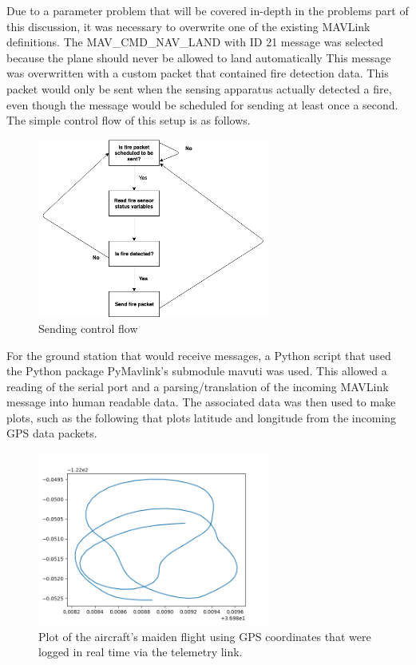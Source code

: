 \documentclass[12pt,journal,compsoc]{IEEEtran}
\begin{document}
Due to a parameter problem that will be covered in-depth in the problems part of this discussion, it was necessary to overwrite one of the existing MAVLink definitions. The MAV\_CMD\_NAV\_LAND with ID 21 message was selected because the plane should never be allowed to land automatically This message was overwritten with a custom packet that contained fire detection data. This packet would only be sent when the sensing apparatus actually detected a fire, even though the message would be scheduled for sending at least once a second. The simple control flow of this setup is as follows.
\begin{figure}[h!]
\hspace*{0cm}
\centering
\includegraphics[width=3in]{Sending.png}
\caption{Sending control flow}
\label{sending}
\end{figure}

For the ground station that would receive messages, a Python script that used the Python package PyMavlink's submodule mavuti was used. This allowed a reading of the serial port and a parsing/translation of the incoming MAVLink message into human readable data. The associated data was then used to make plots, such as the following that plots latitude and longitude from the incoming GPS data packets.
\begin{figure}[h!]
\hspace*{0cm}
\centering
\includegraphics[width=3in]{flight02-22-2019_maiden.png}
\caption{Plot of the aircraft's maiden flight using GPS coordinates that were logged in real time via the telemetry link.}
\label{maidenFlightPlot}
\end{figure}
\end{document}
